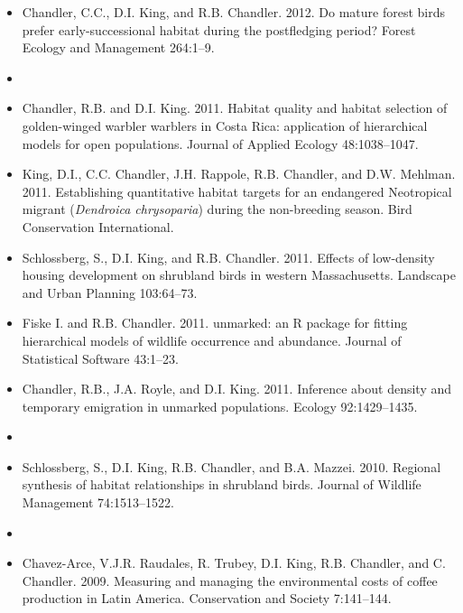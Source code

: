\documentclass[12pt]{article}
\begin{document}
\begin{itemize}
\item Chandler, C.C., D.I. King, and R.B. Chandler. 2012. Do mature
  forest birds prefer early-successional habitat
  during the postfledging period? Forest Ecology and Management 264:1--9.

\item[] { \\}

\item Chandler, R.B. and D.I. King. 2011. Habitat quality and
  habitat selection of golden-winged warbler warblers in Costa Rica:
  application of hierarchical models for open populations. Journal of
  Applied Ecology 48:1038--1047.

\item King, D.I., C.C. Chandler, J.H. Rappole, R.B. Chandler, and
  D.W. Mehlman. 2011. Establishing quantitative habitat targets
  for an endangered Neotropical migrant ({\it Dendroica chrysoparia})
  during the non-breeding season. Bird Conservation
  International. %

\item Schlossberg, S., D.I. King, and R.B. Chandler. 2011. Effects
  of low-density housing development on shrubland birds
  in western Massachusetts. Landscape and Urban Planning 103:64--73.

\item Fiske I. and R.B. Chandler. 2011. unmarked: an R package
  for fitting hierarchical models of wildlife occurrence and
  abundance. Journal of Statistical Software 43:1--23.

\item Chandler, R.B., J.A. Royle, and D.I. King. 2011. Inference
  about density and temporary emigration in unmarked
  populations. Ecology 92:1429--1435.


\item[] { \\}

\item Schlossberg, S., D.I. King, R.B. Chandler, and
  B.A. Mazzei. 2010. Regional synthesis of habitat relationships in
  shrubland birds. Journal of Wildlife Management 74:1513--1522.

\item[] { \\}

\item Chavez-Arce, V.J.R. Raudales, R. Trubey, D.I. King,
  R.B. Chandler, and C. Chandler. 2009. Measuring and managing the
  environmental costs of coffee production in Latin
  America. Conservation and Society 7:141--144.


\end{itemize}
\end{document}
